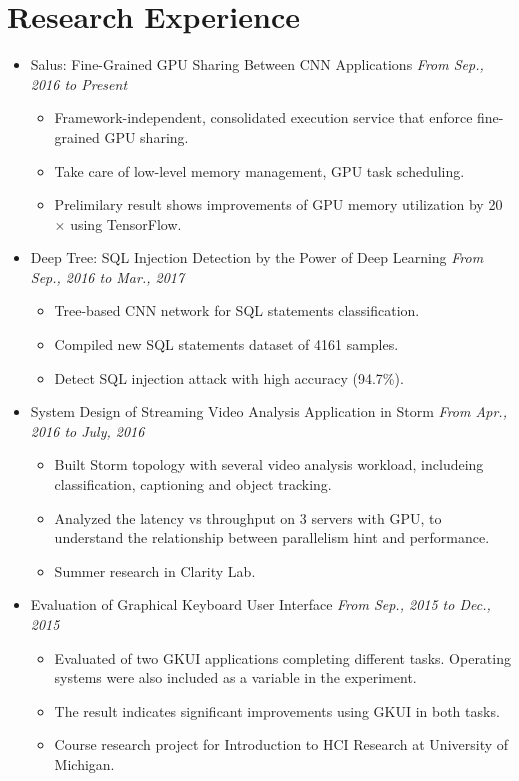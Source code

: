 \documentclass[a4paper,11pt]{article}
\begin{document}
\section{Research Experience}
\begin{itemize}
    \item Salus: Fine-Grained GPU Sharing Between CNN Applications \hfill \textit{From Sep., 2016 to Present}
    \begin{itemize}
        \item Framework-independent, consolidated execution service that enforce fine-grained GPU sharing.
        \item Take care of low-level memory management, GPU task scheduling.
        \item Prelimilary result shows improvements of GPU memory utilization by 20$\times$ using TensorFlow.
    \end{itemize}

    \item Deep Tree: SQL Injection Detection by the Power of Deep Learning \hfill \textit{From Sep., 2016 to Mar., 2017}
    \begin{itemize}
        \item Tree-based CNN network for SQL statements classification.
        \item Compiled new SQL statements dataset of 4161 samples.
        \item Detect SQL injection attack with high accuracy (94.7\%).
    \end{itemize}

    \item System Design of Streaming Video Analysis Application in Storm \hfill \textit{From Apr., 2016 to July, 2016}
    \begin{itemize}
        \item Built Storm topology with several video analysis workload, includeing classification, 
captioning and object tracking.
        \item Analyzed the latency vs throughput on 3 servers with GPU, to understand the relationship 
between parallelism hint and performance.
        \item Summer research in Clarity Lab.
    \end{itemize}

    \item Evaluation of Graphical Keyboard User Interface \hfill \textit{From Sep., 2015 to Dec., 2015}
    \begin{itemize}
        \item Evaluated of two GKUI applications completing different tasks. Operating systems were also
included as a variable in the experiment.
        \item The result indicates significant improvements using GKUI in both tasks.
        \item Course research project for Introduction to HCI Research at University of Michigan.
    \end{itemize}


\end{itemize}
\end{document}
